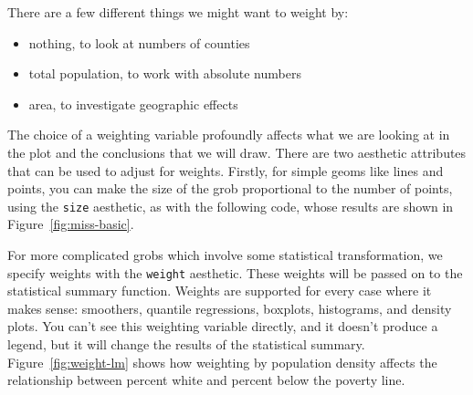 There are a few different things we might want to weight by: 

\begin{itemize}
  \item nothing, to look at numbers of counties
  \item total population, to work with absolute numbers
  \item area, to investigate geographic effects
\end{itemize}

\noindent The choice of a weighting variable profoundly affects what we are looking at in the plot and the conclusions that we will draw.  There are two aesthetic attributes that can be used to adjust for weights.  Firstly, for simple geoms like lines and points, you can make the size of the grob proportional to the number of points, using the {\tt size} aesthetic, as with the following code, whose results are shown in Figure~\ref{fig:miss-basic}.

%


For more complicated grobs which involve some statistical transformation, we specify weights with the {\tt weight} aesthetic.  These weights will be passed on to the statistical summary function.  Weights are supported for every case where it makes sense: smoothers, quantile regressions, boxplots, histograms, and density plots.  You can't see this weighting variable directly, and it doesn't produce a legend, but it will change the results of the statistical summary.  Figure~\ref{fig:weight-lm} shows how weighting by population density affects the relationship between percent white and percent below the poverty line.

%


